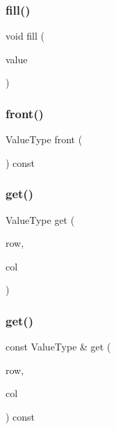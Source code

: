 \mbox{\label{classSparseGrid_ac8f8ff1a5d0997596cbedbc2162e4649}} 
\subsubsection{\texorpdfstring{fill()}{fill()}}
{\footnotesize\ttfamily void fill (\begin{DoxyParamCaption}\item[{const Value\+Type \&}]{value }\end{DoxyParamCaption})}

\mbox{\label{classSparseGrid_abaa174a9d74f7e7e38d4944fa43b5a33}} 
\subsubsection{\texorpdfstring{front()}{front()}}
{\footnotesize\ttfamily Value\+Type front (\begin{DoxyParamCaption}{ }\end{DoxyParamCaption}) const}

\mbox{\label{classSparseGrid_a49fcb88bae29483f4cb0858f29f6384e}} 
\subsubsection{\texorpdfstring{get()}{get()}\hspace{0.1cm}{\footnotesize\ttfamily [1/4]}}
{\footnotesize\ttfamily Value\+Type get (\begin{DoxyParamCaption}\item[{int}]{row,  }\item[{int}]{col }\end{DoxyParamCaption})}

\mbox{\label{classSparseGrid_a2b88a9c3e739296050588ad389667146}} 
\subsubsection{\texorpdfstring{get()}{get()}\hspace{0.1cm}{\footnotesize\ttfamily [2/4]}}
{\footnotesize\ttfamily const Value\+Type \& get (\begin{DoxyParamCaption}\item[{int}]{row,  }\item[{int}]{col }\end{DoxyParamCaption}) const}


